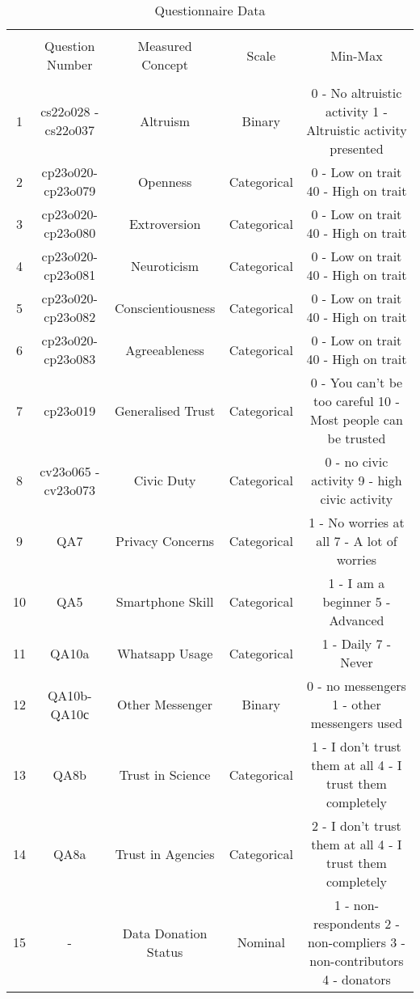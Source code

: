
\begin{table}[!htbp] \centering 
  \caption{Questionnaire Data} 
  \label{} 
\begin{tabular}{@{\extracolsep{5pt}} ccccc} 
\\[-1.8ex]\hline 
\hline \\[-1.8ex] 
 & Question Number & Measured Concept & Scale & Min-Max \\ 
\hline \\[-1.8ex] 
1 & cs22o028 - cs22o037 & Altruism & Binary & 0 - No altruistic activity 1 -  Altruistic activity presented \\ 
2 & cp23o020-cp23o079 & Openness & Categorical & 0 - Low on trait  40 - High on trait \\ 
3 & cp23o020-cp23o080 & Extroversion & Categorical & 0 - Low on trait 40 - High on trait \\ 
4 & cp23o020-cp23o081 & Neuroticism & Categorical & 0 - Low on trait 40 - High on trait \\ 
5 & cp23o020-cp23o082 & Conscientiousness & Categorical & 0 - Low on trait 40 - High on trait \\ 
6 & cp23o020-cp23o083 & Agreeableness & Categorical & 0 - Low on trait 40 - High on trait \\ 
7 & cp23o019 & Generalised Trust & Categorical & 0 - You can’t be too careful  10 -  Most people can be trusted \\ 
8 & cv23o065 - cv23o073 & Civic Duty & Categorical & 0 - no civic activity 9 - high civic activity \\ 
9 & QA7 & Privacy Concerns & Categorical & 1 - No worries at all 7 - A lot of worries \\ 
10 & QA5 & Smartphone Skill & Categorical & 1 - I am a beginner 5 - Advanced \\ 
11 & QA10a & Whatsapp Usage & Categorical & 1 - Daily 7 - Never \\ 
12 & QA10b-QA10с & Other Messenger & Binary & 0 - no messengers 1 - other messengers used \\ 
13 & QA8b & Trust in Science & Categorical & 1 - I don't trust them at all 4 - I trust them completely \\ 
14 & QA8a & Trust in Agencies & Categorical & 2 - I don't trust them at all 4 - I trust them completely \\ 
15 & - & Data Donation Status & Nominal & 1 - non-respondents 2 - non-compliers 3 - non-contributors 4 - donators \\ 

\end{tabular}
\end{table}
